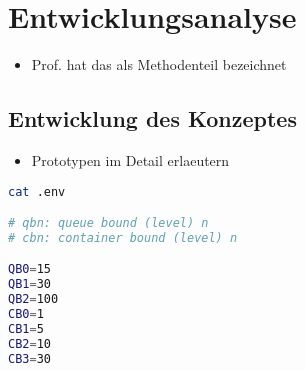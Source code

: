 \chapter{Entwicklungsanalyse}
\begin{itemize}
  \item Prof. hat das als Methodenteil bezeichnet
\end{itemize}

\section{Entwicklung des Konzeptes}
\begin{itemize}
  \item Prototypen im Detail erlaeutern
\end{itemize}




\renewcommand\theadalign{bc}
\renewcommand\theadfont{\bfseries}
\renewcommand\theadgape{\Gape[4pt]}
\renewcommand\cellgape{\Gape[4pt]}


\begin{lstlisting}[language=bash]
cat .env

# qbn: queue bound (level) n
# cbn: container bound (level) n

QB0=15
QB1=30
QB2=100
CB0=1
CB1=5
CB2=10
CB3=30
\end{lstlisting}


